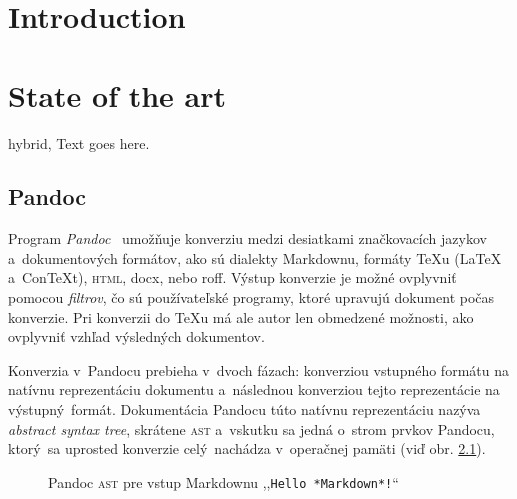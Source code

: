\documentclass[
  digital,     %
  oneside,     %
  nosansbold,  %
  nocolorbold, %
  lof,         %
  lot,         %
]{fithesis4}
\begin{document}

\chapter{Introduction}

\chapter{State of the art}
\begin{markdown*}{%
  hybrid,
}
Text goes here.
\end{markdown*}

\section{Pandoc}
Program \emph{Pandoc}~\cite{pandoc} umožňuje konverziu medzi desiatkami značkovacích jazykov a~dokumentových formátov, ako sú dialekty Markdownu, formáty \TeX u (\LaTeX{} a~Con\TeX{}t), \textsc{html}, docx, nebo roff. Výstup konverzie je možné ovplyvniť pomocou \emph{filtrov}, čo sú používateľské programy, ktoré upravujú dokument počas konverzie. Pri konverzii do \TeX u má ale autor len obmedzené možnosti, ako ovplyvniť vzhľad výsledných dokumentov.

Konverzia v~Pandocu prebieha v~dvoch fázach: konverziou vstupného formátu na natívnu reprezentáciu dokumentu a~následnou konverziou tejto reprezentácie na výstupný formát. Dokumentácia Pandocu túto natívnu reprezentáciu nazýva \emph{abstract syntax tree}, skrátene \textsc{ast} a~vskutku sa jedná o~strom prvkov Pandocu, ktorý sa uprosted konverzie celý nachádza v~operačnej pamäti (viď obr. \ref{fig:pandoc-ast}).

\begin{figure}
  \centering
  \caption{Pandoc \textsc{ast} pre vstup Markdownu ,,\texttt{Hello *Markdown*!}``}
  \label{fig:pandoc-ast}
\end{figure}
\end{document}
